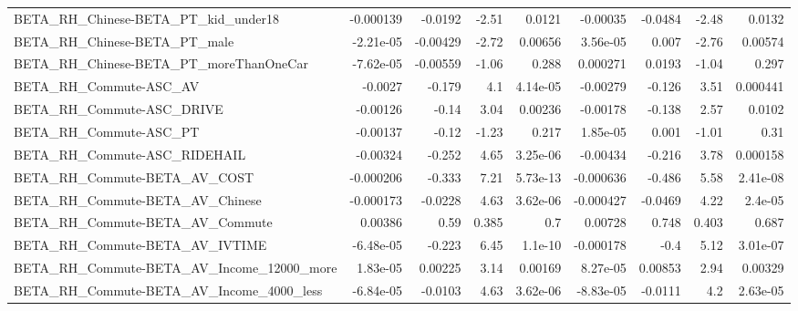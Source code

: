 \begin{tabular}{lrrrrrrrr}
BETA\_RH\_Chinese-BETA\_PT\_kid\_under18                &   -0.000139 &      -0.0192 &    -2.51 &   0.0121 &   -0.00035 &     -0.0484 &        -2.48 &        0.0132 \\
BETA\_RH\_Chinese-BETA\_PT\_male                       &   -2.21e-05 &     -0.00429 &    -2.72 &  0.00656 &   3.56e-05 &       0.007 &        -2.76 &       0.00574 \\
BETA\_RH\_Chinese-BETA\_PT\_moreThanOneCar             &   -7.62e-05 &     -0.00559 &    -1.06 &    0.288 &   0.000271 &      0.0193 &        -1.04 &         0.297 \\
BETA\_RH\_Commute-ASC\_AV                             &     -0.0027 &       -0.179 &      4.1 & 4.14e-05 &   -0.00279 &      -0.126 &         3.51 &      0.000441 \\
BETA\_RH\_Commute-ASC\_DRIVE                          &    -0.00126 &        -0.14 &     3.04 &  0.00236 &   -0.00178 &      -0.138 &         2.57 &        0.0102 \\
BETA\_RH\_Commute-ASC\_PT                             &    -0.00137 &        -0.12 &    -1.23 &    0.217 &   1.85e-05 &       0.001 &        -1.01 &          0.31 \\
BETA\_RH\_Commute-ASC\_RIDEHAIL                       &    -0.00324 &       -0.252 &     4.65 & 3.25e-06 &   -0.00434 &      -0.216 &         3.78 &      0.000158 \\
BETA\_RH\_Commute-BETA\_AV\_COST                       &   -0.000206 &       -0.333 &     7.21 & 5.73e-13 &  -0.000636 &      -0.486 &         5.58 &      2.41e-08 \\
BETA\_RH\_Commute-BETA\_AV\_Chinese                    &   -0.000173 &      -0.0228 &     4.63 & 3.62e-06 &  -0.000427 &     -0.0469 &         4.22 &       2.4e-05 \\
BETA\_RH\_Commute-BETA\_AV\_Commute                    &     0.00386 &         0.59 &    0.385 &      0.7 &    0.00728 &       0.748 &        0.403 &         0.687 \\
BETA\_RH\_Commute-BETA\_AV\_IVTIME                     &   -6.48e-05 &       -0.223 &     6.45 &  1.1e-10 &  -0.000178 &        -0.4 &         5.12 &      3.01e-07 \\
BETA\_RH\_Commute-BETA\_AV\_Income\_12000\_more          &    1.83e-05 &      0.00225 &     3.14 &  0.00169 &   8.27e-05 &     0.00853 &         2.94 &       0.00329 \\
BETA\_RH\_Commute-BETA\_AV\_Income\_4000\_less           &   -6.84e-05 &      -0.0103 &     4.63 & 3.62e-06 &  -8.83e-05 &     -0.0111 &          4.2 &      2.63e-05 \\

\end{tabular}
